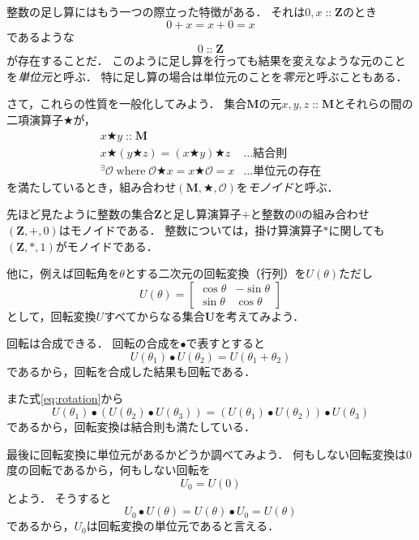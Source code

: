 \documentclass[twocolumn]{jsbook}
\newcommand{\keyword}[1]{\emph{#1}}
\newcommand{\istypeof}{\mathop{::}}
\newcommand{\mathbinaryop}{\bigstar}
\newcommand{\mathidentity}{\mathcal{O}}
\newcommand{\mathsetname}[1]{\boldsymbol{#1}}
\newcommand{\mathtriple}[3]{(#1,#2,#3)}
\newcommand{\mathwhere}{\mathop{\text{where}}}
\begin{document}
整数の足し算にはもう一つの際立った特徴がある．
それは$0,x\istypeof\mathsetname{Z}$のとき$$0+x=x+0=x$$であるような$$0\istypeof\mathsetname{Z}$$が存在することだ．
このように足し算を行っても結果を変えなような元のことを\keyword{単位元}と呼ぶ．
特に足し算の場合は単位元のことを\keyword{零元}と呼ぶこともある．

さて，これらの性質を一般化してみよう．
集合$\mathsetname{M}$の元$x,y,z\istypeof\mathsetname{M}$とそれらの間の二項演算子$\mathbinaryop$が，
\begin{align}
x\mathbinaryop y\istypeof\mathsetname{M}\\
x\mathbinaryop(y\mathbinaryop z)=(x\mathbinaryop y)\mathbinaryop z&\dots\text{結合則}\\
{}^\exists\mathidentity\mathwhere\mathidentity\mathbinaryop x=x\mathbinaryop\mathidentity=x&\dots\text{単位元の存在}
\end{align}
を満たしているとき，組み合わせ$\mathtriple{\mathsetname{M}}{\mathbinaryop}{\mathidentity}$を\keyword{モノイド}と呼ぶ．

先ほど見たように整数の集合$\mathsetname{Z}$と足し算演算子$+$と整数の$0$の組み合わせ$\mathtriple{\mathsetname{Z}}{+}{0}$はモノイドである．
整数については，掛け算演算子$*$に関しても$\mathtriple{\mathsetname{Z}}{*}{1}$がモノイドである．

他に，例えば回転角を$\theta$とする二次元の回転変換（行列）を$U(\theta)$ただし$$U(\theta)=\begin{bmatrix}\cos\theta&-\sin\theta\\\sin\theta&\cos\theta\end{bmatrix}$$として，回転変換$U$すべてからなる集合$\mathsetname{U}$を考えてみよう．

回転は合成できる．
回転の合成を$\bullet$で表すとすると
\begin{equation}
\label{eq:rotation}
U(\theta_1)\bullet U(\theta_2)=U(\theta_1+\theta_2)
\end{equation}
であるから，回転を合成した結果も回転である．

また式\eqref{eq:rotation}から$$U(\theta_1)\bullet\left(U(\theta_2)\bullet U(\theta_3)\right)=\left(U(\theta_1)\bullet U(\theta_2)\right)\bullet U(\theta_3)$$
であるから，回転変換は結合則も満たしている．

最後に回転変換に単位元があるかどうか調べてみよう．
何もしない回転変換は$0$度の回転であるから，何もしない回転を$$U_0=U(0)$$とよう．
そうすると$$U_0\bullet U(\theta)=U(\theta)\bullet U_0=U(\theta)$$であるから，$U_0$は回転変換の単位元であると言える．
\end{document}
